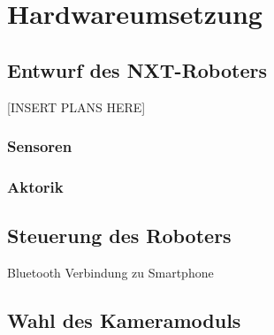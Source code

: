 \chapter{Hardwareumsetzung}
\section{Entwurf des NXT-Roboters}

[INSERT PLANS HERE]
\subsection{Sensoren}
\subsection{Aktorik}

\section{Steuerung des Roboters}
Bluetooth Verbindung zu Smartphone

\section{Wahl des Kameramoduls}

